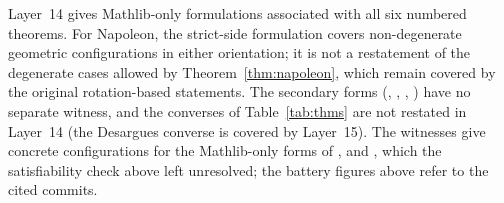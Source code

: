 \documentclass[11pt]{article}
\theoremstyle{definition}
\theoremstyle{remark}
\begin{document}
Layer~14 gives Mathlib-only formulations associated with all six numbered theorems. For Napoleon,
the strict-side formulation covers non-degenerate geometric configurations in either orientation; it
is not a restatement of the degenerate cases allowed by Theorem~\ref{thm:napoleon}, which remain
covered by the original rotation-based statements. The secondary
forms (, ,
, ) have no separate witness, and the
converses of Table~\ref{tab:thms} are not restated in Layer~14 (the Desargues converse is covered
by Layer~15). The witnesses give concrete configurations for the Mathlib-only forms of
,  and , which the
satisfiability check above left unresolved; the battery figures above refer to the cited commits.
\end{document}
